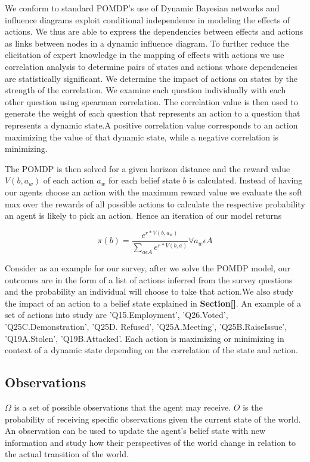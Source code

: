 {We conform to standard POMDP's use of Dynamic Bayesian networks and influence diagrams exploit conditional independence in modeling the effects of actions. We thus are able to express the dependencies between effects and actions as links between nodes in a dynamic influence diagram. To further reduce the elicitation of expert knowledge in the mapping of effects with actions we use correlation analysis to determine pairs of states and actions whose dependencies are statistically significant. We determine the impact of actions on states by the strength of the correlation. We examine each question individually with each other question using spearman correlation. The correlation value is then used to generate the weight of each question that represents an action to a question that represents a dynamic state.A positive correlation value corresponds to an action maximizing the value of that dynamic state, while a negative correlation is minimizing.

The POMDP is then solved for a given horizon distance and the reward value $V(b,a_w)$ of each action $a_w$ for each belief state $b$ is calculated. Instead of having our agents choose an action with the maximum reward value we evaluate the soft max over the rewards of all possible actions to calculate the respective probability an agent is likely to pick an action. Hence an iteration of our model returns 

\begin{equation}
\pi(b)=\frac{e^{r*V(b,a_w)}}{\sum_{a\epsilon A} e^{r* V(b,a)}} \forall a_w\epsilon A
\end{equation}

Consider as an example for our survey, after we solve the POMDP model, our outcomes are in the form of a list of actions inferred from the survey questions and the probability an individual will choose to take that action.We also study the impact of an action to a belief state explained in \textbf{Section[]}. An example of a set of actions into study are 'Q15.Employment', 'Q26.Voted', 'Q25C.Demonstration', 'Q25D. Refused', 'Q25A.Meeting', 'Q25B.RaiseIssue', 'Q19A.Stolen', 'Q19B.Attacked'. Each action is maximizing or minimizing in context of a dynamic state depending on the correlation of the state and action.

\subsection{Observations}

$\Omega$  is  a  set  of  possible  observations  that  the  agent  may receive. $O$ is the probability of receiving specific observations given the current state of the world. An observation can be used to update the agent's belief state with new information and study how their perspectives of the world change in relation to the actual transition of the world.

}
